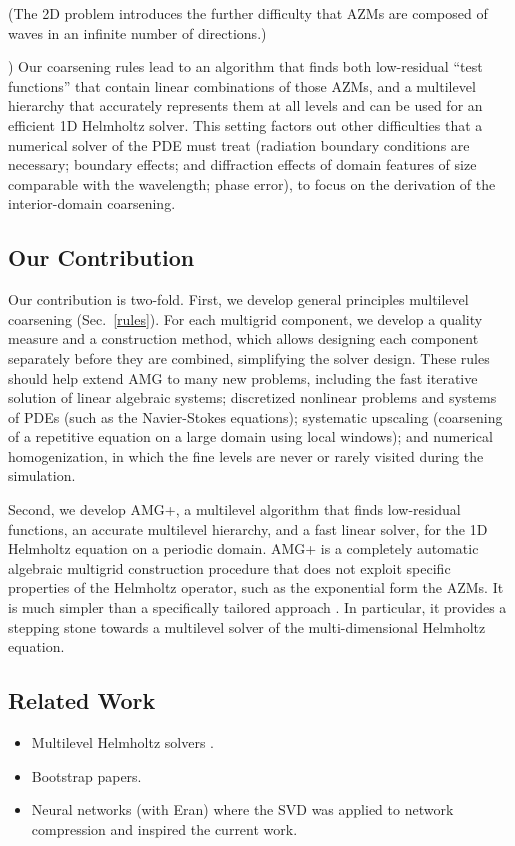 \documentclass{article}
\begin{document}
(The 2D problem introduces the further difficulty that AZMs are composed of waves in an infinite number of directions.)

) Our coarsening rules lead to an algorithm that finds both low-residual ``test functions'' that contain linear combinations of those AZMs, and a multilevel hierarchy that accurately represents them at all levels and can be used for an efficient 1D Helmholtz solver. This setting factors out other difficulties that a numerical solver of the PDE must treat (radiation boundary conditions are necessary; boundary effects; and diffraction effects of domain features of size comparable with the wavelength; phase error), to focus on the derivation of the interior-domain coarsening.

\subsection{Our Contribution}
Our contribution is two-fold. First, we develop general principles multilevel coarsening (Sec.~\ref{rules}). For each multigrid component, we develop a quality measure and a construction method, which allows designing each component separately before they are combined, simplifying the solver design. These rules should help extend AMG to many new problems, including the fast iterative solution of linear algebraic systems; discretized nonlinear problems and systems of PDEs (such as the Navier-Stokes equations); systematic upscaling (coarsening of a repetitive equation on a large domain using local windows); and numerical homogenization, in which the fine levels are never or rarely visited during the simulation.

Second, we develop AMG+, a multilevel algorithm that finds low-residual functions, an accurate multilevel hierarchy, and a fast linear solver, for the 1D Helmholtz equation on a periodic domain. AMG+ is a completely automatic algebraic multigrid construction procedure that does not exploit specific properties of the Helmholtz operator, such as the exponential form the AZMs. It is much simpler than a specifically tailored approach  \cite{wave_ray, later_papers}. In particular, it provides a stepping stone towards a multilevel solver of the multi-dimensional Helmholtz equation.

\subsection{Related Work}
{\bf
\begin{itemize}
    \item Multilevel Helmholtz solvers \cite{wave_ray, later_papers}.
    \item Bootstrap papers.
    \item Neural networks (with Eran) where the SVD was applied to network compression and inspired the current work.
\end{itemize}
}
\end{document}
